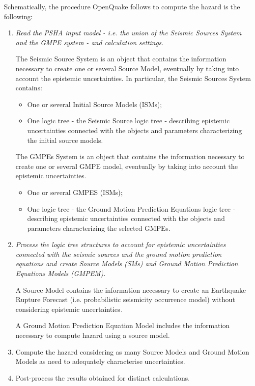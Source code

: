 Schematically, the procedure OpenQuake follows to compute the hazard is the following:
%
\begin{enumerate}
%
\item \emph{Read the PSHA input model - i.e. the union of the Seismic Sources System and the GMPE system - and calculation settings.}
	
	The Seismic Source System is an object that contains the information necessary to create one or several Source Model, eventually by taking into account the epistemic uncertainties. 
	In particular, the Seismic Sources System contains:
	\begin{itemize}
	\item One or several Initial Source Models (ISMs);
	\item One logic tree - the Seismic Source logic tree - describing epistemic uncertainties connected with the objects and parameters characterizing the initial source models.
	\end{itemize}
	The GMPEs System is an object that contains the information necessary to create one or several GMPE model, eventually by taking into account the epistemic uncertainties. 
	\begin{itemize}
	\item One or several GMPES (ISMs);
	\item One logic tree - the Ground Motion Prediction Equations logic tree - describing epistemic uncertainties connected with the objects and parameters characterizing the selected GMPEs.	
	\end{itemize}

%
\item \emph{Process the logic tree structures to account for epistemic uncertainties connected with the seismic sources and the ground motion prediction equations and create Source Models (SMs) and Ground Motion Prediction Equations Models (GMPEM)}.
	
	A Source Model contains the information necessary to create an Earthquake Rupture Forecast (i.e. probabilistic seismicity occurrence model) without considering epistemic uncertainties.
	
	A Ground Motion Prediction Equation Model includes the information necessary to compute hazard using a source model. 

\item Compute the hazard considering as many Source Models and Ground Motion Models as need to adequately characterise uncertainties.
\item Post-process the results obtained for distinct calculations.
\end{enumerate}
%